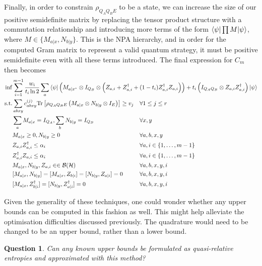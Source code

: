 \documentclass[10pt, a4paper]{article}
\numberwithin{equation}{section} %
\theoremstyle{definition}
\theoremstyle{plain}
\newtheorem{question}{Question}
\newcommand{\dintv}[2]{\left\{#1,\ldots,#2\right\}}
\newcommand{\?}{\mathrel{?}} %
\newcommand{\Tr}{\mathrm{Tr}} %
\newcommand{\Hs}{\mathcal{H}} %
\newcommand{\sB}{\mathcal{B}}
\begin{document}
      Finally, in order to constrain \(\rho_{Q_A Q_B E}\) to be a state, we can increase the size of our positive semidefinite matrix by replacing the tensor product structure with a commutation relationship and introducing more terms of the form \(\braket{\psi|\prod M|\psi}\), where \(M \in \{M_{a|x}, N_{b|y}\}\). This is the NPA hierarchy, and in order for the computed Gram matrix to represent a valid quantum strategy, it must be positive semidefinite even with all these terms introduced. The final expression for \(C_m\) then becomes
      \begin{align}
        \inf & \sum_{i=1}^{m-1} \frac{w_i}{t_i \ln 2} \sum_a \bra{\psi} \left(M_{a|x^*} \otimes I_{Q_B} \otimes \left( Z_{a,i} + Z_{a,i}^{\dagger} + (1-t_i)  Z_{a,i}^{\dagger}Z_{a,i}\right) \right) + t_i \left( I_{Q_A Q_B} \otimes Z_{a,i}Z_{a,i}^{\dagger}\right) \ket{\psi} \\
        \text{s.t.} & \begin{aligned}[t] 
          & \sum_{abxy} c^{(j)}_{abxy} \Tr\left[\rho_{Q_A Q_B E} \left(M_{a|x} \otimes N_{b|y} \otimes I_{E}\right) \right] \geq v_j & & \forall 1 \leq j \leq r \\
          & \sum_{a} M_{a|x} = I_{Q_A}, \sum_{b} N_{b|y} = I_{Q_B} & & \forall x, y \\
          & M_{a|x} \geq 0, N_{b|y} \geq 0 & & \forall a, b, x, y \\
          & Z_{a,i} Z_{a,i}^{\dagger} \leq \alpha_i & & \forall a, i \in \dintv{1}{m-1} \\
          & Z_{a,i}^{\dagger} Z_{a,i} \leq \alpha_i & & \forall a, i \in \dintv{1}{m-1} \\
          & M_{a|x}, N_{b|y}, Z_{a,i} \in \in \sB(\Hs) & & \forall a, b, x, y, i \\
          & [M_{a|x}, N_{b|y}] = [M_{a|x}, Z_{b|i}] = [N_{b|y}, Z_{a|i}] = 0 & & \forall a, b, x, y, i \\
          & [M_{a|x}, Z_{b|i}^{\dagger}] = [N_{b|y}, Z_{a|i}^{\dagger}] = 0 & & \forall a, b, x, y, i \\
        \end{aligned}
      \end{align}

      Given the generality of these techniques, one could wonder whether any upper bounds can be computed in this fashion as well. This might help alleviate the optimisation difficulties discussed previously. The quadrature would need to be changed to be an upper bound, rather than a lower bound.
      \begin{question}
        Can any known upper bounds be formulated as quasi-relative entropies and approximated with this method?
      \end{question}
\end{document}
